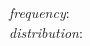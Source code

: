\documentclass[preview]{standalone}
\begin{document}
\begin{center}
\vspace{0.3cm} \textit{frequency}: \\ \vspace{0.4cm}\textit{distribution}:
\end{center}
\end{document}
